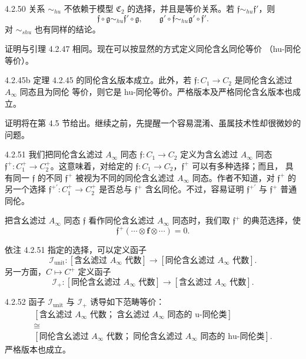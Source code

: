 \begin{lemma}{4.2.50}\label{lem:4-2-50}
关系 $\sim_{hu}$ 不依赖于模型 $\mathfrak C_2$ 的选择，并且是等价关系。若
$\mathfrak f\sim_{hu}\mathfrak f'$，则
\[
 \mathfrak f\circ\mathfrak g\sim_{hu}\mathfrak f'\circ\mathfrak g,
 \qquad
 \mathfrak g'\circ\mathfrak f\sim_{hu}\mathfrak g'\circ\mathfrak f'.
\]
对 $\sim_{shu}$ 也有同样的结论。
\end{lemma}

证明与引理 4.2.47 相同。现在可以按显然的方式定义同伦含幺同伦等价
（hu-同伦等价）。

\begin{theorem}{4.2.45b}\label{thm:4-2-45b}
定理 4.2.45 的同伦含幺版本成立。此外，若
$\mathfrak f\colon C_1\to C_2$ 是同伦含幺滤过 $A_\infty$ 同态且为同伦
等价，则它是 hu-同伦等价。严格版本及严格同伦含幺版本也成立。
\end{theorem}

证明将在第 4.5 节给出。继续之前，先提醒一个容易混淆、虽属技术性却很微妙的
问题。

\begin{remark}{4.2.51}\label{rem:4-2-51}
我们把同伦含幺滤过 $A_\infty$ 同态
$\mathfrak f\colon C_1\to C_2$ 定义为含幺滤过 $A_\infty$ 同态
$\mathfrak f^+\colon C_1^+\to C_2^+$。这意味着，对给定的
$\mathfrak f\colon C_1\to C_2$，$\mathfrak f^+$ 可以有多种选择；而且，
具有同一 $\mathfrak f$ 的不同 $\mathfrak f^+$ 被视为不同的同伦含幺滤过
$A_\infty$ 同态。作者不知道，对 $\mathfrak f^+$ 的另一个选择
$\mathfrak f^{+\prime}\colon C_1^+\to C_2^+$ 是否总与
$\mathfrak f^+$ 含幺同伦。不过，容易证明
$\mathfrak f^{+\prime}$ 与 $\mathfrak f^+$ 普通同伦。

把含幺滤过 $A_\infty$ 同态 $\mathfrak f$ 看作同伦含幺滤过
$A_\infty$ 同态时，我们取 $\mathfrak f^+$ 的典范选择，使
\[
 \mathfrak f^+(\cdots\otimes\mathbf f\otimes\cdots)=0.
\]
\end{remark}

依注 4.2.51 指定的选择，可以定义函子
\[
 \mathcal I_{\mathrm{unit}}\colon
 [\text{含幺滤过 }A_\infty\text{ 代数}]
 \longrightarrow
 [\text{同伦含幺滤过 }A_\infty\text{ 代数}].
\]
另一方面，$C\mapsto C^+$ 定义函子
\[
 \mathcal I_+\colon
 [\text{同伦含幺滤过 }A_\infty\text{ 代数}]
 \longrightarrow
 [\text{含幺滤过 }A_\infty\text{ 代数}].
\]

\begin{proposition}{4.2.52}\label{prop:4-2-52}
函子 $\mathcal I_{\mathrm{unit}}$ 与 $\mathcal I_+$ 诱导如下范畴等价：
{\small
\[
 \begin{gathered}
 [\text{含幺滤过 }A_\infty\text{ 代数；}\
 \text{含幺滤过 }A_\infty\text{ 同态的 u-同伦类}]\\[-0.2em]
 \cong\\[-0.2em]
 [\text{同伦含幺滤过 }A_\infty\text{ 代数；}\
 \text{同伦含幺滤过 }A_\infty\text{ 同态的 hu-同伦类}].
 \end{gathered}
\]
}
严格版本也成立。
\end{proposition}

